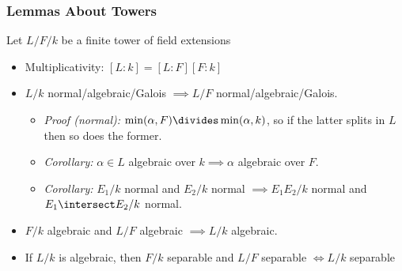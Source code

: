 \hypertarget{lemmas-about-towers}{%
\subsubsection{Lemmas About Towers}\label{lemmas-about-towers}}

Let \(L/F/k\) be a finite tower of field extensions

\begin{itemize}
\item
  Multiplicativity: \([L : k] = [L: F][F: k]\)
\item
  \(L/k\) normal/algebraic/Galois \(\implies L/F\)
  normal/algebraic/Galois.

  \begin{itemize}
  \tightlist
  \item
    \emph{Proof (normal):} \(\min(\alpha, F) \divides \min(\alpha, k)\),
    so if the latter splits in \(L\) then so does the former.
  \item
    \emph{Corollary:} \(\alpha \in L\) algebraic over
    \(k \implies \alpha\) algebraic over \(F\).
  \item
    \emph{Corollary:} \(E_1/k\) normal and \(E_2/k\) normal
    \(\implies E_1E_2/k\) normal and \(E_1 \intersect E_2 / k\) normal.
  \end{itemize}
\end{itemize}

\begin{center}
\end{center}

\begin{itemize}
\item
  \(F/k\) algebraic and \(L/F\) algebraic \(\implies L/k\) algebraic.
\item
  If \(L/k\) is algebraic, then \(F/k\) separable and \(L/F\) separable
  \(\iff L/k\) separable
\end{itemize}

\begin{center}
\end{center}

